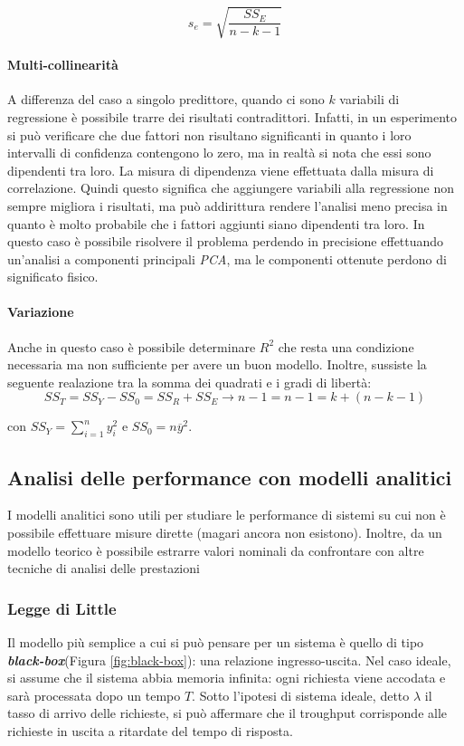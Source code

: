 \documentclass{article}
\begin{document}
\begin{equation}
  s_e = \sqrt{\frac{SS_E}{n-k-1}}
  \label{eq:se-multiple-linear-regression}
\end{equation}

\paragraph{Multi-collinearità}A differenza del caso a singolo predittore, quando ci 
sono $k$ variabili di regressione è possibile trarre dei risultati contradittori. 
Infatti, in un esperimento si può verificare che due fattori non risultano significanti
in quanto i loro intervalli di confidenza contengono lo zero, ma in realtà si nota che
essi sono dipendenti tra loro. La misura di dipendenza viene effettuata dalla misura 
di correlazione. Quindi questo significa che aggiungere variabili alla regressione non
sempre migliora i risultati, ma può addirittura rendere l'analisi meno precisa in 
quanto è molto probabile che i fattori aggiunti siano dipendenti tra loro. In questo 
caso è possibile risolvere il problema perdendo in precisione effettuando un'analisi 
a componenti principali \textit{PCA}, ma le componenti ottenute perdono di significato
fisico.

\paragraph{Variazione} Anche in questo caso è possibile determinare $R^2$ che resta 
una condizione necessaria ma non sufficiente per avere un buon modello. Inoltre,
sussiste la seguente realazione tra la somma dei quadrati e i gradi di libertà:
\[
  SS_T = SS_Y -  SS_0 = SS_R + SS_E \to n-1 = n - 1 = k + (n-k-1)
\]

con $SS_Y = \displaystyle\sum_{i=1}^{n}y_i^2$ e $SS_0 = n\overline{y}^2$.
\clearpage
\subsection{Analisi delle performance con modelli analitici}
I modelli analitici sono utili per studiare le performance di sistemi su cui non è
possibile effettuare misure dirette (magari ancora non esistono). Inoltre, da un
modello teorico è possibile estrarre valori nominali da confrontare con altre 
tecniche di analisi delle prestazioni

\subsubsection{Legge di Little}
Il modello più semplice a cui si può pensare per un sistema è quello di tipo\textbf{\textit{
  black-box}}(Figura \ref{fig:black-box}): una relazione ingresso-uscita. Nel caso ideale, si assume che il sistema abbia
memoria infinita: ogni richiesta viene accodata e sarà processata dopo un tempo $T$.
Sotto l'ipotesi di sistema ideale, detto $\lambda$ il tasso di arrivo delle richieste, si 
può affermare che il troughput corrisponde alle richieste in uscita a ritardate del tempo di 
risposta.
\end{document}
